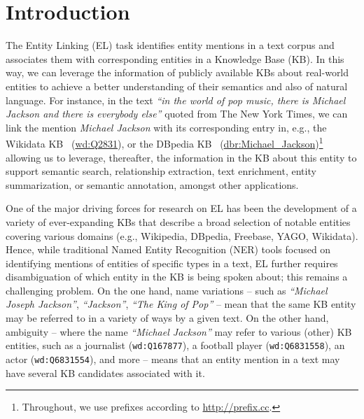 \documentclass{llncs}
\begin{document}
\section{Introduction} 
\label{sec:intro}


The Entity Linking (EL) task identifies entity mentions in a text corpus and associates them with corresponding entities in a Knowledge Base (KB). In this way, we can leverage the information of publicly available KBs about real-world entities to achieve a better understanding of their semantics and also of natural language. For instance, in the text \textit{``in the world of pop music, there is Michael Jackson and there is everybody else''} quoted from The New York Times, we can link the mention \textit{Michael Jackson} with its corresponding entry in, e.g., the Wikidata KB~\cite{Wikidata_vrandevcic2014wikidata} (\url{wd:Q2831}), or the DBpedia KB~\cite{dbpedia-lehmann2015dbpedia} (\url{dbr:Michael_Jackson})\footnote{Throughout, we use prefixes according to \url{http://prefix.cc}.} allowing us to leverage, thereafter, the information in the KB about this entity to support semantic search, relationship extraction, text enrichment, entity summarization, or semantic annotation, amongst other applications.

One of the major driving forces for research on EL has been the development of a variety of ever-expanding KBs that describe a broad selection of notable entities covering various domains (e.g., Wikipedia, DBpedia, Freebase, YAGO, Wikidata). Hence, while traditional Named Entity Recognition (NER) tools focused on identifying mentions of entities of specific types in a text, EL further requires disambiguation of which entity in the KB is being spoken about; this remains a challenging problem. On the one hand, name variations -- such as \textit{``Michael Joseph Jackson''}, \textit{``Jackson''}, \textit{``The King of Pop''} -- mean that the same KB entity may be referred to in a variety of ways by a given text. On the other hand, ambiguity -- where the name \textit{``Michael Jackson''} may refer to various (other) KB entities, such as a journalist (\texttt{wd:Q167877}), a football player (\texttt{wd:Q6831558}), an actor (\texttt{wd:Q6831554}), and more -- means that an entity mention in a text may have several KB candidates associated with it.
\end{document}
